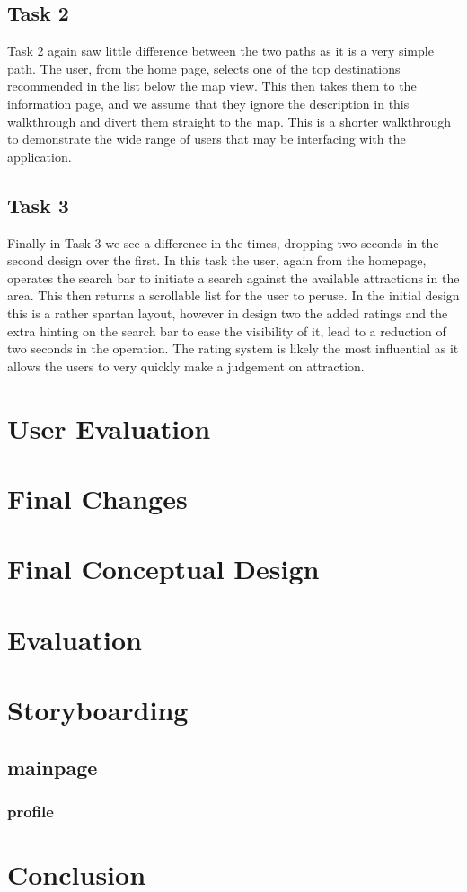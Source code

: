 \documentclass{article}
\begin{document}
\subsection{Task 2}
Task 2 again saw little difference between the two paths as it is a very simple path.
The user, from the home page, selects one of the top destinations recommended in the list below the map view.
This then takes them to the information page, and we assume that they ignore the description in this walkthrough and divert them straight to the map.
This is a shorter walkthrough to demonstrate the wide range of users that may be interfacing with the application.
\subsection{Task 3}
Finally in Task 3 we see a difference in the times, dropping two seconds in the second design over the first.
In this task the user, again from the homepage, operates the search bar to initiate a search against the available attractions in the area.
This then returns a scrollable list for the user to peruse.
In the initial design this is a rather spartan layout, however in design two the added ratings and the extra hinting on the search bar to ease the visibility of it, lead to a reduction of two seconds in the operation.
The rating system is likely the most influential as it allows the users to very quickly make a judgement on attraction.
\section{User Evaluation}
\section{Final Changes}
\section{Final Conceptual Design}
\section{Evaluation}
\section{Storyboarding}
\subsection{mainpage}
\subsubsection{profile}
\section{Conclusion}
\end{document}
